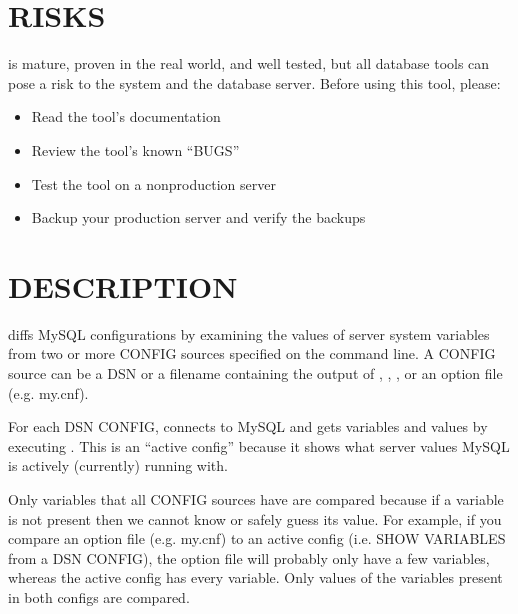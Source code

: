 \documentclass[letterpaper,10pt,english]{sphinxmanual}
\begin{document}
\section{RISKS}
\label{\detokenize{mariadb-config-diff:risks}}
 is mature, proven in the real world, and well tested,
but all database tools can pose a risk to the system and the database
server.  Before using this tool, please:
\begin{itemize}
\item {} 
Read the tool’s documentation

\item {} 
Review the tool’s known “BUGS”

\item {} 
Test the tool on a non\sphinxhyphen{}production server

\item {} 
Backup your production server and verify the backups

\end{itemize}


\section{DESCRIPTION}
\label{\detokenize{mariadb-config-diff:description}}
 diffs MySQL configurations by examining the values of server
system variables from two or more CONFIG sources specified on the command
line.  A CONFIG source can be a DSN or a filename containing the output of
, , , or
an option file (e.g. my.cnf).

For each DSN CONFIG,  connects to MySQL and gets variables
and values by executing .  This is
an “active config” because it shows what server values MySQL is
actively (currently) running with.

Only variables that all CONFIG sources have are compared because if a
variable is not present then we cannot know or safely guess its value.
For example, if you compare an option file (e.g. my.cnf) to an active config
(i.e. SHOW VARIABLES from a DSN CONFIG), the option file will probably
only have a few variables, whereas the active config has every variable.
Only values of the variables present in both configs are compared.
\end{document}
